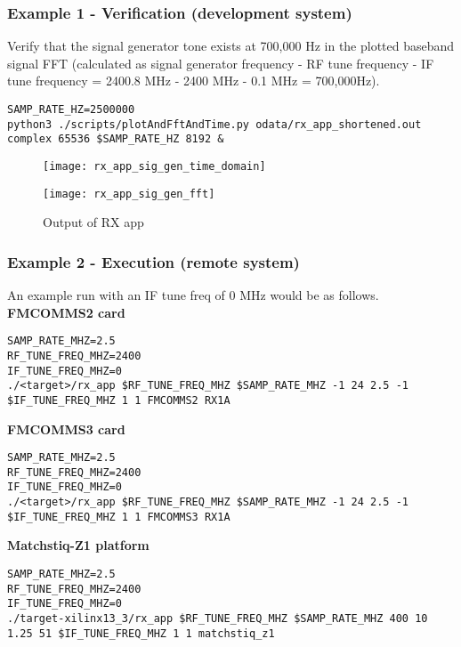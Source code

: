 \subsubsection{Example 1 - Verification (development system)}
Verify that the signal generator tone exists at 700,000 Hz in the plotted baseband signal FFT (calculated as signal generator frequency - RF tune frequency - IF tune frequency = 2400.8 MHz - 2400 MHz - 0.1 MHz = 700,000Hz).
\begin{lstlisting}
SAMP_RATE_HZ=2500000
python3 ./scripts/plotAndFftAndTime.py odata/rx_app_shortened.out complex 65536 $SAMP_RATE_HZ 8192 &
\end{lstlisting}
        \begin{figure}[H]
        \begin{minipage}{.5\textwidth}
                \texttt{[image: rx\_app\_sig\_gen\_time\_domain]}
                \label{fig:rx_app_sig_gen_time_domain}
        \end{minipage}%
        \begin{minipage}{.5\textwidth}
                \texttt{[image: rx\_app\_sig\_gen\_fft]}
        \end{minipage}
                \caption{Output of RX app}
                \label{fig:rx_app_sig_gen_fft}
        \end{figure}
\pagebreak
\subsubsection{Example 2 - Execution (remote system)}
An example run with an IF tune freq of 0 MHz would be as follows.
\\\noindent\textbf{FMCOMMS2 card}
\begin{lstlisting}
SAMP_RATE_MHZ=2.5
RF_TUNE_FREQ_MHZ=2400
IF_TUNE_FREQ_MHZ=0
./<target>/rx_app $RF_TUNE_FREQ_MHZ $SAMP_RATE_MHZ -1 24 2.5 -1 $IF_TUNE_FREQ_MHZ 1 1 FMCOMMS2 RX1A
\end{lstlisting}
\noindent\textbf{FMCOMMS3 card}
\begin{lstlisting}
SAMP_RATE_MHZ=2.5
RF_TUNE_FREQ_MHZ=2400
IF_TUNE_FREQ_MHZ=0
./<target>/rx_app $RF_TUNE_FREQ_MHZ $SAMP_RATE_MHZ -1 24 2.5 -1 $IF_TUNE_FREQ_MHZ 1 1 FMCOMMS3 RX1A
\end{lstlisting}
\noindent\textbf{Matchstiq-Z1 platform}
\begin{lstlisting}
SAMP_RATE_MHZ=2.5
RF_TUNE_FREQ_MHZ=2400
IF_TUNE_FREQ_MHZ=0
./target-xilinx13_3/rx_app $RF_TUNE_FREQ_MHZ $SAMP_RATE_MHZ 400 10 1.25 51 $IF_TUNE_FREQ_MHZ 1 1 matchstiq_z1
\end{lstlisting}
